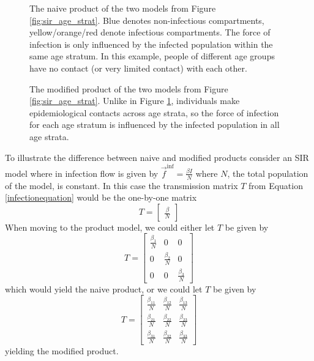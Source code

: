 \documentclass[referee,sn-basic]{sn-jnl}%
\theoremstyle{definition}
\newcommand{\fvec}{\vec{f}}
\begin{document}
\begin{figure}
    \centering
    
    \caption{The naive product of the two models from Figure \ref{fig:sir_age_strat}. Blue denotes non-infectious compartments, yellow/orange/red denote infectious compartments. The force of infection is only influenced by the infected population within the same age stratum. In this example, people of different age groups have no contact (or very limited contact) with each other.}
    \label{fig:naive_product}
\end{figure}

\begin{figure}
    \centering
    
    \caption{The modified product of the two models from Figure \ref{fig:sir_age_strat}. Unlike in Figure \ref{fig:naive_product}, individuals make epidemiological contacts across age strata, so the force of infection for each age stratum is influenced by the infected population in all age strata.}
    \label{fig:modified_product}
\end{figure}

\FloatBarrier


To illustrate the difference between naive and modified products consider an SIR model where in infection flow is given by $\fvec^\text{inf} = \frac{\beta I}{N}$ where $N$, the total population of the model, is constant. In this case the transmission matrix $T$ from Equation \ref{infectionequation} would be the one-by-one matrix 
\[
    T = \begin{bmatrix} \frac{\beta}{N} \end{bmatrix}
\]
When moving to the product model, we could either let $T$ be given by
\[
    T = \begin{bmatrix}
        \frac{\beta_1}{N} & 0 & 0 \\
        0 & \frac{\beta_2}{N} & 0\\
        0 & 0 & \frac{\beta_3}{N}
    \end{bmatrix}
\]
which would yield the naive product, or we could let $T$ be given by
\[
    T = \begin{bmatrix}
        \frac{\beta_{11}}{N} & \frac{\beta_{12}}{N} & \frac{\beta_{13}}{N} \\
        \frac{\beta_{21}}{N} & \frac{\beta_{22}}{N} & \frac{\beta_{23}}{N}\\
        \frac{\beta_{31}}{N} & \frac{\beta_{32}}{N} & \frac{\beta_{33}}{N}
    \end{bmatrix}
\]
yielding the modified product.
\end{document}
